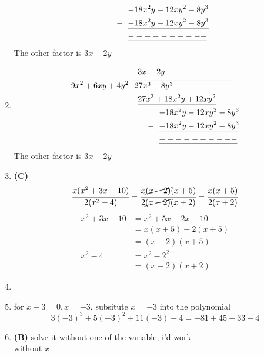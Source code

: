\begin{multicols}{2}
\begin{enumerate}[label={\textbf{\arabic*.}}]
\begin{align*}
& \hspace{32pt} {-18x^2y - 12xy^2 - 8y^3} \\
-\hspace{-26pt} & \hspace{32pt} \underline{-18x^2y - 12xy^2 -8y^3}\\
& \hspace{32pt} \underline{----------}
\end{align*}
The other factor is \(3x - 2y\)
\item
\begin{align*}
&\hspace{6pt} 3x - 2y \\
9x^2 + 6xy + 4y^2 \hspace{5pt}  & \overline{\hspace{2pt} 27x^3 - 8y^3 \hspace{1in}} \\
-\hspace{-3pt} & \hspace{6pt} \underline{27x^3 + 18x^2y + 12xy^2} \\
& \hspace{32pt} {-18x^2y - 12xy^2 - 8y^3} \\
-\hspace{-26pt} & \hspace{32pt} \underline{-18x^2y - 12xy^2 -8y^3}\\
& \hspace{32pt} \underline{----------}
\end{align*}
The other factor is $3x - 2y$
\item \textbf{(C)} \\
\[\cfrac{x(x^2 + 3x - 10)}{2(x^2 - 4)} = \cfrac{x\cancel{(x-2)}(x+5)}{2\cancel{(x-2)}(x+2)} = \cfrac{x(x+5)}{2(x+2)}\]
\begin{align*}
x^2 + 3x - 10 &= x^2 + 5x - 2x - 10 \\
&= x(x+5) - 2(x+5) \\
&= (x-2)(x+5) \\
x^2 - 4 &= x^2 - 2^2 \\
&= (x-2)(x+2)
\end{align*}
\item
\item for $x+3 = 0 , x = -3$, subsitute $x=-3$ into the polynomial \\
$$3(-3)^3 + 5(-3)^2 + 11(-3) - 4 = -81 + 45 -33 - 4$$
\item \textbf{(B)} solve it without one of the variable, i'd work \\ without $x$

\end{enumerate}
\end{multicols}
